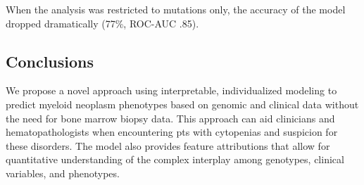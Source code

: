 When the analysis was restricted to mutations only, the accuracy of the model dropped dramatically (77\%, ROC-AUC .85).


\subsection{Conclusions}%

We propose a novel approach using interpretable, individualized modeling to predict myeloid neoplasm phenotypes based on genomic and clinical data without the need for bone marrow biopsy data. This approach can aid clinicians and hematopathologists when encountering pts with cytopenias and suspicion for these disorders. The model also provides feature attributions that allow for quantitative understanding of the complex interplay among genotypes, clinical variables, and phenotypes.



